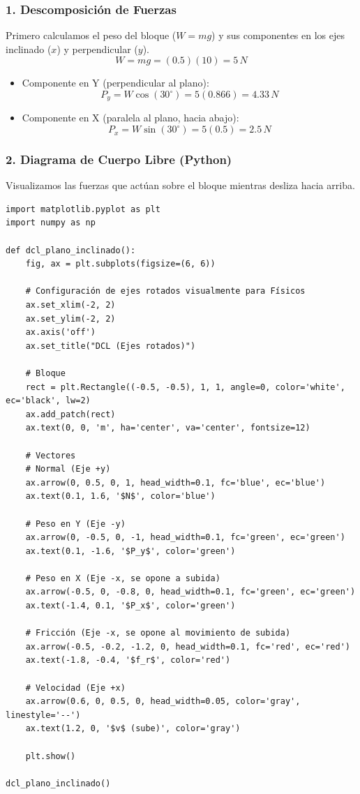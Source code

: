 \documentclass[12pt, a4paper]{article}
\begin{document}
\subsubsection*{1. Descomposición de Fuerzas}
Primero calculamos el peso del bloque ($W = mg$) y sus componentes en los ejes inclinado ($x$) y perpendicular ($y$).
$$ W = m g = (0.5)(10) = 5 \, \si{N} $$

\begin{itemize}
    \item Componente en Y (perpendicular al plano):
    $$ P_y = W \cos(30^\circ) = 5(0.866) = 4.33 \, \si{N} $$
    \item Componente en X (paralela al plano, hacia abajo):
    $$ P_x = W \sin(30^\circ) = 5(0.5) = 2.5 \, \si{N} $$
\end{itemize}

\subsubsection*{2. Diagrama de Cuerpo Libre (Python)}
Visualizamos las fuerzas que actúan sobre el bloque mientras desliza hacia arriba.

\begin{lstlisting}
import matplotlib.pyplot as plt
import numpy as np

def dcl_plano_inclinado():
    fig, ax = plt.subplots(figsize=(6, 6))
    
    # Configuración de ejes rotados visualmente para Físicos
    ax.set_xlim(-2, 2)
    ax.set_ylim(-2, 2)
    ax.axis('off')
    ax.set_title("DCL (Ejes rotados)")
    
    # Bloque
    rect = plt.Rectangle((-0.5, -0.5), 1, 1, angle=0, color='white', ec='black', lw=2)
    ax.add_patch(rect)
    ax.text(0, 0, 'm', ha='center', va='center', fontsize=12)
    
    # Vectores
    # Normal (Eje +y)
    ax.arrow(0, 0.5, 0, 1, head_width=0.1, fc='blue', ec='blue')
    ax.text(0.1, 1.6, '$N$', color='blue')
    
    # Peso en Y (Eje -y)
    ax.arrow(0, -0.5, 0, -1, head_width=0.1, fc='green', ec='green')
    ax.text(0.1, -1.6, '$P_y$', color='green')
    
    # Peso en X (Eje -x, se opone a subida)
    ax.arrow(-0.5, 0, -0.8, 0, head_width=0.1, fc='green', ec='green')
    ax.text(-1.4, 0.1, '$P_x$', color='green')
    
    # Fricción (Eje -x, se opone al movimiento de subida)
    ax.arrow(-0.5, -0.2, -1.2, 0, head_width=0.1, fc='red', ec='red')
    ax.text(-1.8, -0.4, '$f_r$', color='red')
    
    # Velocidad (Eje +x)
    ax.arrow(0.6, 0, 0.5, 0, head_width=0.05, color='gray', linestyle='--')
    ax.text(1.2, 0, '$v$ (sube)', color='gray')

    plt.show()

dcl_plano_inclinado()
\end{lstlisting}
\end{document}
